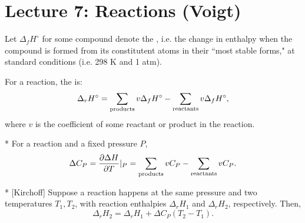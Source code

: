 \section*{Lecture 7: Reactions (Voigt)}
\setcounter{section}{7}
\setcounter{subsection}{0}
\setcounter{defn}{0}
\setcounter{defncontainer}{0}

\begin{defn}
	Let $\Delta_f H^\circ$ for some compound denote the , i.e. the change in enthalpy when the compound is formed from its constitutent atoms in their ``most stable forms," at standard conditions (i.e. 298 K and 1 atm).
\end{defn}

\begin{fact}
	For a reaction, the  is: \[
		\Delta_r H^\circ = \sum_{\textnormal{products}} v\Delta_f H^\circ - \sum_{\textnormal{reactants}} v\Delta_f H^\circ,
	\]
	where $v$ is the coefficient of some reactant or product in the reaction.
\end{fact}

\begin{defn}*
	For a reaction and a fixed pressure $P$, 
	\[
		\Delta C_P = \frac{\partial \Delta H}{\partial T}|_P = \sum_{\textnormal{products}} vC_P - \sum_{\textnormal{reactants}} vC_P.
	\]
\end{defn}

\begin{law}*
	[Kirchoff]
	Suppose a reaction happens at the same pressure and two temperatures $T_1, T_2$, with reaction enthalpies $\Delta_r H_1$ and $\Delta_r H_2$, respectively. Then, \[
		\Delta_r H_2 = \Delta_r H_1 + \Delta C_P (T_2-T_1).
	\]
\end{law}

